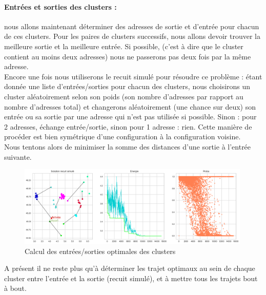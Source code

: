 \documentclass[12pt]{article}
\begin{document}
\paragraph{Entrées et sorties des clusters :} nous allons maintenant déterminer des adresses de sortie et d'entrée pour chacun de ces clusters. Pour les paires de clusters successifs, nous allons devoir trouver la meilleure sortie et la meilleure entrée. Si possible, (c'est à dire que le cluster contient au moins deux adresses) nous ne passerons pas deux fois par la même adresse.\\
Encore une fois nous utiliserons le recuit simulé pour résoudre ce problème : étant donnée une liste d'entrées/sorties pour chacun des clusters, nous choisirons un cluster aléatoirement selon son poids (son nombre d'adresses par rapport au nombre d'adresses total) et changerons aléatoirement (une chance sur deux) son entrée ou sa sortie par une adresse qui n'est pas utilisée si possible. Sinon : pour 2 adresses, échange entrée/sortie, sinon pour 1 adresse : rien. Cette manière de procéder est bien symétrique d'une configuration à la configuration voisine.\\
Nous tentons alors de minimiser la somme des distances d'une sortie à l'entrée suivante.

\begin{figure}[H]
\caption{Calcul des entrées/sorties optimales des clusters}
\begin{center}
\includegraphics[width=0.99\textwidth]{ARA_entrees_sorties}
\end{center}
\end{figure}


A présent il ne reste plus qu'à déterminer les trajet optimaux  au sein de chaque cluster entre l'entrée et la sortie (recuit simulé), et à mettre tous les trajets bout à bout.
\end{document}

